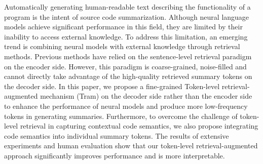 Automatically generating human-readable text describing the functionality of a program is the intent of source code summarization. Although neural language models achieve significant performance in this field, they are limited by their inability to access external knowledge. To address this limitation, an emerging trend is combining neural models with external knowledge through retrieval methods. Previous methods have relied on the sentence-level retrieval paradigm on the encoder side. However, this paradigm is coarse-grained, noise-filled and cannot directly take advantage of the high-quality retrieved summary tokens on the decoder side. In this paper, we propose a fine-grained Token-level retrieval-augmented mechanism (Tram) on the decoder side rather than the encoder side to enhance the performance of neural models and produce more low-frequency tokens in generating summaries. Furthermore, to overcome the challenge of token-level retrieval in capturing contextual code semantics, we also propose integrating code semantics into individual summary tokens. The results of extensive experiments and human evaluation show that our token-level retrieval-augmented approach significantly improves performance and is more interpretable.